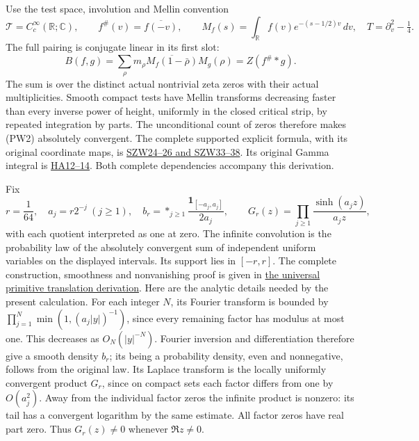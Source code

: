 \documentclass[
  10pt,
  a4paper,
]{article}
\begin{document}
Use the test space, involution and Mellin convention \[
\mathcal T=C_c^\infty(\mathbb R;\mathbb C),\qquad
f^\#(v)=\overline{f(-v)},\qquad
M_f(s)=\int_\mathbb R f(v)e^{-(s-1/2)v}\,dv,
\quad T=\partial_v^2-\tfrac14.
\tag{PW1}
\] The full pairing is conjugate linear in its first slot: \[
 B(f,g)=\sum_\rho m_\rho\overline{M_f(1-\bar\rho)}M_g(\rho)
 =Z(f^\#*g).
\tag{PW2}
\] The sum is over the distinct actual nontrivial zeta zeros with their
actual multiplicities. Smooth compact tests have Mellin transforms
decreasing faster than every inverse power of height, uniformly in the
closed critical strip, by repeated integration by parts. The
unconditional count of zeros therefore makes (PW2) absolutely
convergent. The complete supported explicit formula, with its original
coordinate maps, is
\href{https://github.com/KokunoYumeto/zeta-function-research-reader/blob/76f421965914beb133df797835f940849844dc4f/workbenches/splitzero-tandem/branches/tau-zero-prime-positivity/SUPPORTED_ZERO_PRIME_WEIL_DERIVATION.md}{SZW24--26
and SZW33--38}. Its original Gamma integral is
\href{https://github.com/KokunoYumeto/zeta-function-research-reader/blob/76f421965914beb133df797835f940849844dc4f/workbenches/splitzero-tandem/branches/tau-zero-prime-positivity/HEAT_CAUCHY_ARITHMETIC_DERIVATION.md}{HA12--14}.
Both complete dependencies accompany this derivation.

Fix \[
 r=\frac1{64},\quad a_j=r2^{-j}\ (j\ge1),\quad
 b_r=\mathop{*}_{j\ge1}\frac{\mathbf1_{[-a_j,a_j]}}{2a_j},\qquad
 G_r(z)=\prod_{j\ge1}\frac{\sinh(a_jz)}{a_jz},
\tag{PW3}
\] with each quotient interpreted as one at zero. The infinite
convolution is the probability law of the absolutely convergent sum of
independent uniform variables on the displayed intervals. Its support
lies in \([-r,r]\). The complete construction, smoothness and
nonvanishing proof is given in
\href{UNIVERSAL_PRIMITIVE_TRANSLATION_CRITERION.md}{the universal
primitive translation derivation}. Here are the analytic details needed
by the present calculation. For each integer \(N\), its Fourier
transform is bounded by \(\prod_{j=1}^{N}\min(1,(a_j|y|)^{-1})\), since
every remaining factor has modulus at most one. This decreases as
\(O_N(|y|^{-N})\). Fourier inversion and differentiation therefore give
a smooth density \(b_r\); its being a probability density, even and
nonnegative, follows from the original law. Its Laplace transform is the
locally uniformly convergent product \(G_r\), since on compact sets each
factor differs from one by \(O(a_j^2)\). Away from the individual factor
zeros the infinite product is nonzero: its tail has a convergent
logarithm by the same estimate. All factor zeros have real part zero.
Thus \(G_r(z)\ne0\) whenever \(\Re z\ne0\).
\end{document}
